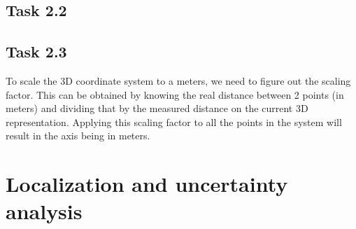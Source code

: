 \documentclass[a4paper]{article} %
\begin{document}
    \subsection*{Task 2.2}
    
    \subsection*{Task 2.3}
    To scale the 3D coordinate system to a meters, we need to figure out the scaling factor. 
    This can be obtained by knowing the real distance between 2 points (in meters) and dividing that by the measured distance on the current 3D representation.  
    Applying this scaling factor to all the points in the system will result in the axis being in meters.

\section{Localization and uncertainty analysis}
    
\end{document}
